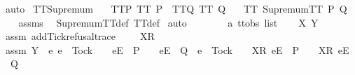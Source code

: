 \begin{isabellebody}
\ auto%
\endisatagproof
{\isafoldproof}%
%
\isadelimproof
\isanewline
%
\endisadelimproof
\isanewline
{}\isamarkupfalse%
\ TT{}{\isacharunderscore}Supremum{\isacharcolon}\isanewline
\ \ \ TT{}{\isacharunderscore}P{\isacharcolon}\ {\isachardoublequoteopen}TT{}\ P{\isachardoublequoteclose}\ \ TT{}{\isacharunderscore}Q{\isacharcolon}\ {\isachardoublequoteopen}TT{}\ Q{\isachardoublequoteclose}\isanewline
\ \ \ {\isachardoublequoteopen}TT{}\ {\isacharparenleft}SupremumTT\ P\ Q{\isacharparenright}{\isachardoublequoteclose}\isanewline
%
\isadelimproof
\ \ %
\endisadelimproof
%
\isatagproof
{}\isamarkupfalse%
\ assms\ \isamarkupfalse%
\ SupremumTT{\isacharunderscore}def\ TT{}{\isacharunderscore}def\isanewline
{}\isamarkupfalse%
\ auto\isanewline
\ \ \isamarkupfalse%
\ {\isasymrho}\ {\isasymrho}{\isacharprime}\ {\isasymsigma}\ {\isacharcolon}{\isacharcolon}\ {\isachardoublequoteopen}{\isacharprime}a\ ttobs\ list{\isachardoublequoteclose}\isanewline
\ \ \isamarkupfalse%
\ X\ Y\isanewline
\ \ \isamarkupfalse%
\ assm{}{\isacharcolon}\ {\isachardoublequoteopen}add{\isacharunderscore}Tick{\isacharunderscore}refusal{\isacharunderscore}trace\ {\isasymrho}\ {\isacharequal}\ {\isasymrho}{\isacharprime}\ {\isacharat}\ {\isacharbrackleft}X{\isacharbrackright}\isactrlsub R\ {\isacharhash}\ {\isasymsigma}{\isachardoublequoteclose}\isanewline
\ \ \isamarkupfalse%
\ assm{}{\isacharcolon}\ {\isachardoublequoteopen}Y\ {\isasyminter}\ {\isacharbraceleft}e{\isachardot}\ e\ {\isasymnoteq}\ Tock\ {\isasymand}\ {\isasymrho}{\isacharprime}\ {\isacharat}\ {\isacharbrackleft}{\isacharbrackleft}e{\isacharbrackright}\isactrlsub E{\isacharbrackright}\ {\isasymin}\ P\ {\isasymand}\ {\isasymrho}{\isacharprime}\ {\isacharat}\ {\isacharbrackleft}{\isacharbrackleft}e{\isacharbrackright}\isactrlsub E{\isacharbrackright}\ {\isasymin}\ Q\ {\isasymor}\ e\ {\isacharequal}\ Tock\ {\isasymand}\ {\isasymrho}{\isacharprime}\ {\isacharat}\ {\isacharbrackleft}{\isacharbrackleft}X{\isacharbrackright}\isactrlsub R{\isacharcomma}\ {\isacharbrackleft}e{\isacharbrackright}\isactrlsub E{\isacharbrackright}\ {\isasymin}\ P\ {\isasymand}\ {\isasymrho}{\isacharprime}\ {\isacharat}\ {\isacharbrackleft}{\isacharbrackleft}X{\isacharbrackright}\isactrlsub R{\isacharcomma}\ {\isacharbrackleft}e{\isacharbrackright}\isactrlsub E{\isacharbrackright}\ {\isasymin}\ Q{\isacharbraceright}\ {\isacharequal}\ {\isacharbraceleft}{\isacharbraceright}{\isachardoublequoteclose}\isanewline

\end{isabellebody}
